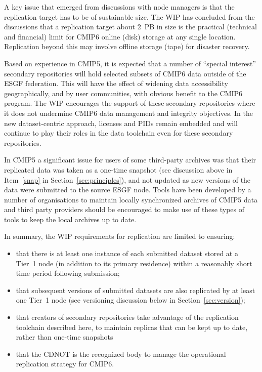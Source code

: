 \documentclass[gmd,manuscript]{copernicus}
\newcommand{\pllabel}[1]{\label{p-#1}\linelabel{l-#1}}
\begin{document}
A key issue that emerged from discussions with node managers is that
the replication target has to be of sustainable size. The WIP has
concluded from the discussions that a replication target about 2~PB in
size is the practical (technical and financial) limit for CMIP6 online
(disk) storage at any single location. Replication beyond this may
involve offline storage (tape) for disaster recovery.

Based on experience in CMIP5, it is expected that a number of
``special interest'' secondary repositories will hold selected subsets
of CMIP6 data outside of the ESGF federation. This will have the
effect of widening data accessibility geographically, and by user
communities, with obvious benefit to the CMIP6 program. The WIP
encourages the support of these secondary repositories where it does
not undermine CMIP6 data management and integrity objectives.
\pllabel{RC1-62}
In the new dataset-centric approach, licenses and PIDs remain embedded
and will continue to play their roles in the data toolchain even for
these secondary repositories.

In CMIP5 a significant issue for users of some third-party archives
was that their replicated data was taken as a one-time snapshot (see
discussion above in Item~\ref{snap} in Section~\ref{sec:principles}),
and not updated as new versions of the data were submitted to the
source ESGF node. Tools have been developed by a number of
organisations to maintain locally synchronized archives of CMIP5 data
and third party providers should be encouraged to make use of these
types of tools to keep the local archives up to date.

In summary, the WIP requirements for replication are limited to
ensuring:

\begin{itemize}
\item that there is at least one instance of each submitted dataset
  stored at a Tier~1 node (in addition to its primary residence)
  within a reasonably short time period following submission;
\item that subsequent versions of submitted datasets are also
  replicated by at least one Tier~1 node (see versioning discussion
  below in Section~\ref{sec:version});
\item that creators of secondary repositories take advantage of the
  replication toolchain described here, to maintain replicas that can
  be kept up to date, rather than one-time snapshots
\item that the CDNOT is the recognized body to manage the operational
  replication strategy for CMIP6.
\end{itemize}
\end{document}
